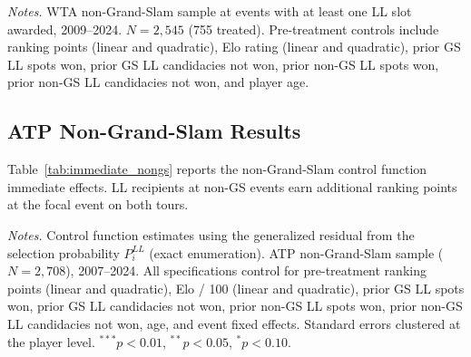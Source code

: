 \begin{table}[htbp]
\centering
\caption{Summary Statistics: WTA Non-Grand-Slam Sample}
\label{tab:sumstats_nongs_wta}
\begin{threeparttable}
\small

\begin{tablenotes}
\footnotesize
\item \textit{Notes.} WTA non-Grand-Slam sample at events with at least one LL slot awarded, 2009--2024. $N = 2{,}545$ (755 treated). Pre-treatment controls include ranking points (linear and quadratic), Elo rating (linear and quadratic), prior GS LL spots won, prior GS LL candidacies not won, prior non-GS LL spots won, prior non-GS LL candidacies not won, and player age.
\end{tablenotes}
\end{threeparttable}
\end{table}

\subsection{ATP Non-Grand-Slam Results}
\label{app:nongs_atp}

Table~\ref{tab:immediate_nongs} reports the non-Grand-Slam control function immediate effects. LL recipients at non-GS events earn additional ranking points at the focal event on both tours.

\begin{table}[htbp]
\centering
\caption{ATP Non-Grand-Slam: Immediate Event-Level Effects (Control Function)}
\label{tab:immediate_nongs}
\begin{threeparttable}
\small

\begin{tablenotes}
\footnotesize
\item \textit{Notes.} Control function estimates using the generalized residual from the selection probability $P_i^{LL}$ (exact enumeration). ATP non-Grand-Slam sample ($N = 2{,}708$), 2007--2024. All specifications control for pre-treatment ranking points (linear and quadratic), Elo / 100 (linear and quadratic), prior GS LL spots won, prior GS LL candidacies not won, prior non-GS LL spots won, prior non-GS LL candidacies not won, age, and event fixed effects. Standard errors clustered at the player level. $^{***}p<0.01$, $^{**}p<0.05$, $^{*}p<0.10$.
\end{tablenotes}
\end{threeparttable}
\end{table}

